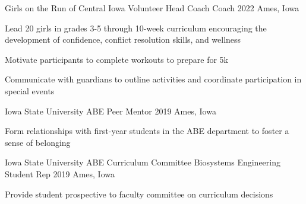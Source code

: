 

\begin{cventries}

  \cventry
    {Girls on the Run of Central Iowa} %
    {Volunteer Head Coach Coach} %
    {2022} %
    {Ames, Iowa} %
    {
      \begin{cvitems} %
      \setlength\itemsep{.4em}
        \item {Lead 20 girls in grades 3-5 through 10-week curriculum encouraging the development of confidence, conflict resolution skills, and wellness}
        \item {Motivate participants to complete workouts to prepare for 5k}
        \item {Communicate with guardians to outline activities and coordinate participation in special events}
      \end{cvitems}
    }
  \vspace*{.5cm}  
  \cventry
    {Iowa State University} %
    {ABE Peer Mentor} %
    {2019} %
    {Ames, Iowa} %
    {
      \begin{cvitems} %
      \setlength\itemsep{.4em}
        \item {Form relationships with first-year students in the ABE department to foster a sense of belonging}
      \end{cvitems}
    }
\vspace*{.5cm}
    \cventry
    {Iowa State University} %
    {ABE Curriculum Committee Biosystems Engineering Student Rep} %
    {2019} %
    {Ames, Iowa} %
    {
      \begin{cvitems} %
      \setlength\itemsep{.4em}
        \item {Provide student prospective to faculty committee on curriculum decisions}
      \end{cvitems}
    }
\end{cventries}